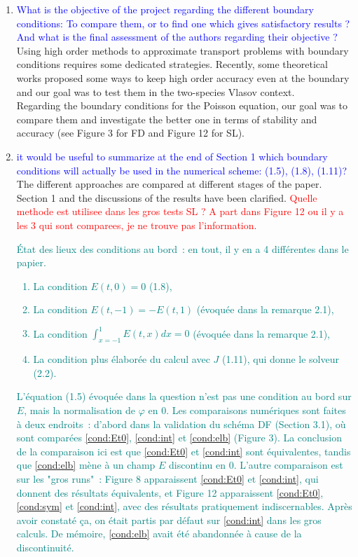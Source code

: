 \documentclass{article}
\begin{document}
\begin{enumerate}
    \item \textcolor{blue}{What is the objective of the project regarding the different boundary conditions:
To compare them, or to find one which gives satisfactory results ?
And what is the final assessment of the authors regarding their objective ? }\\ 
Using high order methods to approximate transport problems with boundary conditions requires some dedicated strategies. 
Recently, some theoretical works proposed some ways to keep high order accuracy even at the boundary and our goal 
was to test them in the two-species Vlasov context. \\
Regarding the boundary conditions for the Poisson equation, our goal was to compare them and investigate the better one 
in terms of stability and accuracy (see Figure 3 for FD and Figure 12 for SL). 
        \item \textcolor{blue}{it would be useful to summarize at the end of Section 1 which boundary conditions will actually be used in the numerical scheme: (1.5), (1.8), (1.11)? }\\
    The different approaches are compared at different stages of the paper. Section 1 and the discussions of the results have been clarified. \textcolor{red}{Quelle methode est utilisee dans les gros tests SL ?  A part dans Figure 12 ou il y a les 3 qui sont comparees, je ne trouve pas l'information. }
    \textcolor{teal}{État des lieux des conditions au bord~: en tout, il y en a 4 différentes dans le papier. 
    \begin{enumerate}[label={(\alph*)}]
    \item\label{cond:Et0} La condition $E(t,0) = 0$ (1.8),
    \item\label{cond:sym} La condition $E(t,-1) = - E(t,1)$ (évoquée dans la remarque 2.1), 
    \item\label{cond:int} La condition $\int_{x=-1}^{1} E(t,x) dx = 0$ (évoquée dans la remarque 2.1), 
    \item\label{cond:elb} La condition plus élaborée du calcul avec $J$ (1.11), qui donne le solveur (2.2).
    \end{enumerate}
    L'équation (1.5) évoquée dans la question n'est pas une condition au bord sur $E$, mais la normalisation de $\varphi$ en $0$. Les comparaisons numériques sont faites à deux endroits~: d'abord dans la validation du schéma DF (Section 3.1), où sont comparées \ref{cond:Et0}, \ref{cond:int} et \ref{cond:elb} (Figure 3). La conclusion de la comparaison ici est que \ref{cond:Et0} et \ref{cond:int} sont équivalentes, tandis que \ref{cond:elb} mène à un champ $E$ discontinu en 0. L'autre comparaison est sur les "gros runs"~: Figure 8 apparaissent \ref{cond:Et0} et \ref{cond:int}, qui donnent des résultats équivalents, et Figure 12 apparaissent \ref{cond:Et0}, \ref{cond:sym} et \ref{cond:int}, avec des résultats pratiquement indiscernables. Après avoir constaté ça, on était partis par défaut sur \ref{cond:int} dans les gros calculs. De mémoire, \ref{cond:elb} avait été abandonnée à cause de la discontinuité. 
}
\end{enumerate}
\end{document}
